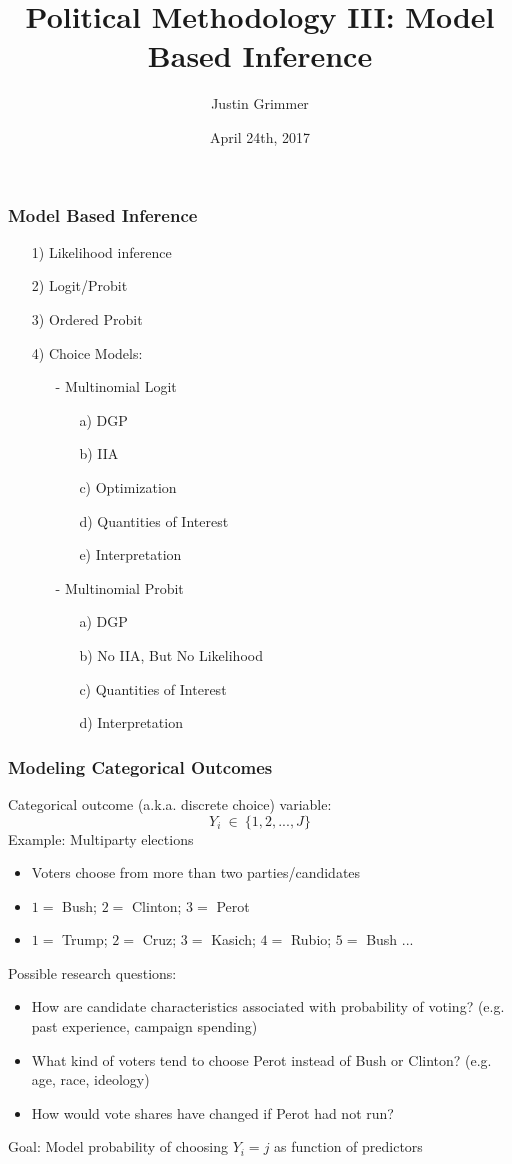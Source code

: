\documentclass{beamer}
\title[Methodology III] %
{Political Methodology III: Model Based Inference}
\author{Justin Grimmer}
\institute[Stanford University]{Associate Professor\\Department of Political Science \\  Stanford University}
\date{April 24th, 2017}
\begin{document}
\begin{frame}
\titlepage
\end{frame}


\begin{frame}
\frametitle{Model Based Inference}

\begin{itemize}
\item[1)] Likelihood inference
\item[2)] Logit/Probit
\item[3)] Ordered Probit
\item[4)] Choice Models:
\begin{itemize}
\item[-] Multinomial Logit
\begin{itemize}
\item[a)] DGP
\item[b)] IIA
\item[c)] Optimization
\item[d)] Quantities of Interest
\item[e)] Interpretation
\end{itemize}
\item[-] Multinomial Probit
\begin{itemize}
\item[a)] DGP
\item[b)] No IIA, But No Likelihood
\item[c)] Quantities of Interest
\item[d)] Interpretation
\end{itemize}
\end{itemize}
\end{itemize}

\end{frame}



\begin{frame}
\frametitle{Modeling Categorical Outcomes}
Categorical outcome (a.k.a. discrete choice) variable:
    $$ Y_i \ \in \ \{1, 2,..., J\}$$
\pause
Example: Multiparty elections
\begin{itemize}
\item Voters choose from more than two parties/candidates
\item $1=$ Bush; $2=$ Clinton; $3=$ Perot
\item $1=$ Trump; $2=$ Cruz; $3=$ Kasich; $4=$ Rubio; $5=$ Bush ...
\end{itemize}
\pause
\medskip
Possible research questions:
  \begin{itemize}
  \item How are candidate characteristics associated with
    probability of voting? (e.g. past experience, campaign spending)
  \item What kind of voters tend to choose Perot instead of Bush
    or Clinton? (e.g. age, race, ideology)
  \item How would vote shares have changed if Perot had not run?
  \end{itemize}
\medskip
\pause
Goal: Model probability of choosing $Y_i = j$ as function of predictors

\end{frame}
\end{document}
